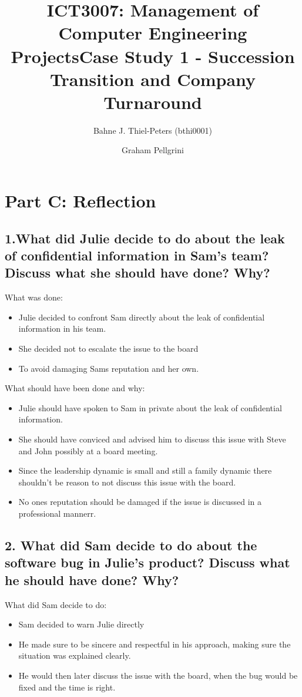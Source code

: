 \documentclass[a4paper,10pt]{article}
\title{ICT3007: Management of Computer Engineering Projects\newline \centering Case Study 1 - Succession Transition and Company Turnaround}
\author{
Bahne J. Thiel-Peters (bthi0001)
}
\begin{document}
\maketitle
\thispagestyle{empty}

\setcounter{page}{1}

\section{Part C: Reflection}
\subsection{1.What did Julie decide to do about the leak of confidential information in Sam’s team? Discuss what she should have done? Why?}

What was done:
\begin{itemize}
    \item Julie decided to confront Sam directly about the leak of confidential information in his team.
    \item She decided not to escalate the issue to the board
    \item To avoid damaging Sams reputation and her own.
\end{itemize}

What should have been done and why:
\begin{itemize}
    \item Julie should have spoken to Sam in private about the leak of confidential information.
    \item She should have conviced and advised him to discuss this issue with Steve and John possibly at a board meeting.
    \item Since the leadership dynamic is small and still a family dynamic there shouldn't be reason to not discuss this issue with the board. 
    \item No ones reputation should be damaged if the issue is discussed in a professional mannerr.
\end{itemize}

\subsection{2. What did Sam decide to do about the software bug in Julie’s product? Discuss what he should have done? Why?}
\author{Graham Pellgrini}

What did Sam decide to do:
\begin{itemize}
    \item Sam decided to warn Julie directly
    \item He made sure to be sincere and respectful in his approach, making sure the situation was explained clearly.
    \item He would then later discuss the issue with the board, when the bug would be fixed and the time is right.
\end{itemize}
\end{document}
